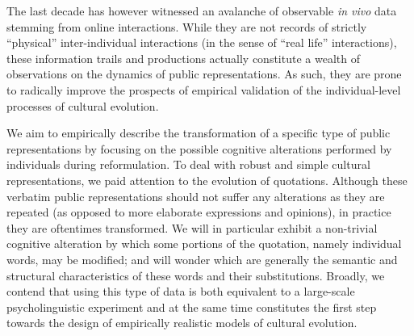The last decade has however witnessed an avalanche of observable \emph{in vivo} data stemming from online interactions. While they are not records of strictly ``physical'' inter-individual interactions (in the sense of ``real life'' interactions), these information trails and productions actually constitute a wealth of observations on the dynamics of public representations. As such, they are prone to radically improve the prospects of empirical validation of the individual-level processes of cultural evolution. 

We aim to empirically describe the transformation of a specific type of public representations by focusing on the possible cognitive alterations performed by individuals during reformulation.  %
To deal with robust and simple cultural representations, we paid attention to the evolution of quotations. Although these verbatim public representations should not suffer any alterations as they are repeated (as opposed to more elaborate expressions and opinions), in practice they are oftentimes transformed.  We will in particular exhibit a non-trivial cognitive alteration by which some portions of the quotation, namely individual words, may be modified; and will wonder which are generally the semantic and structural characteristics of these words and their substitutions. 
Broadly, we contend that using this type of data is both equivalent to a large-scale psycholinguistic experiment and at the same time constitutes the first step towards the design of empirically realistic models of cultural evolution. 

